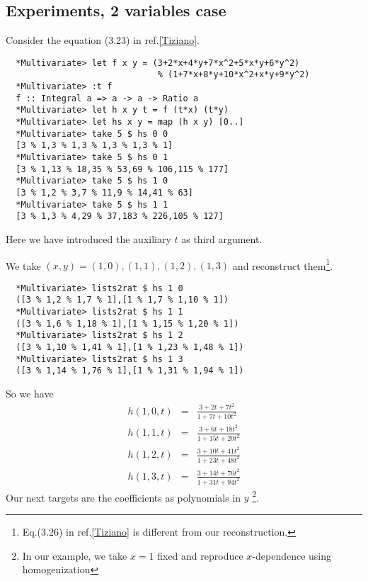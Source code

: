 \documentclass[11pt]{book}
\begin{document}
\subsection{Experiments, 2 variables case}
Consider the equation (3.23) in ref.\ref{Tiziano}.
\begin{verbatim}
  *Multivariate> let f x y = (3+2*x+4*y+7*x^2+5*x*y+6*y^2)
                              % (1+7*x+8*y+10*x^2+x*y+9*y^2)
  *Multivariate> :t f
  f :: Integral a => a -> a -> Ratio a
  *Multivariate> let h x y t = f (t*x) (t*y)
  *Multivariate> let hs x y = map (h x y) [0..]
  *Multivariate> take 5 $ hs 0 0
  [3 % 1,3 % 1,3 % 1,3 % 1,3 % 1]
  *Multivariate> take 5 $ hs 0 1
  [3 % 1,13 % 18,35 % 53,69 % 106,115 % 177]
  *Multivariate> take 5 $ hs 1 0
  [3 % 1,2 % 3,7 % 11,9 % 14,41 % 63]
  *Multivariate> take 5 $ hs 1 1
  [3 % 1,3 % 4,29 % 37,183 % 226,105 % 127]
\end{verbatim}
Here we have introduced the auxiliary $t$ as third argument.

We take $(x,y) = (1,0), (1,1), (1,2), (1,3)$ and reconstruct them\footnote{Eq.(3.26) in ref.\ref{Tiziano} is different from our reconstruction.
}.
\begin{verbatim}
  *Multivariate> lists2rat $ hs 1 0
  ([3 % 1,2 % 1,7 % 1],[1 % 1,7 % 1,10 % 1])
  *Multivariate> lists2rat $ hs 1 1
  ([3 % 1,6 % 1,18 % 1],[1 % 1,15 % 1,20 % 1])
  *Multivariate> lists2rat $ hs 1 2
  ([3 % 1,10 % 1,41 % 1],[1 % 1,23 % 1,48 % 1])
  *Multivariate> lists2rat $ hs 1 3
  ([3 % 1,14 % 1,76 % 1],[1 % 1,31 % 1,94 % 1])
\end{verbatim}
So we have
\begin{eqnarray}
\label{tizianoExample1}
h(1,0,t) &=& \frac{3+2t+7t^2}{1+7t+10t^2} \\
\label{tizianoExample2}
h(1,1,t) &=& \frac{3+6t+18t^2}{1+15t+20t^2} \\
\label{tizianoExample3}
h(1,2,t) &=& \frac{3+10t+41t^2}{1+23t+48t^2} \\
\label{tizianoExample4}
h(1,3,t) &=& \frac{3+14t+76t^2}{1+31t+94t^2}
\end{eqnarray}
Our next targets are the coefficients as polynomials in $y$ \footnote{
In our example, we take $x=1$ fixed and reproduce $x$-dependence using homogenization
}.
\end{document}
